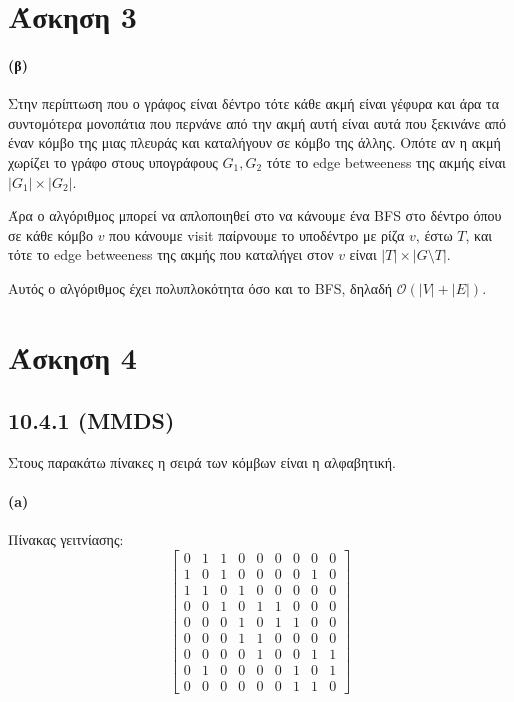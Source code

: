 \documentclass[a4paper,11pt]{article}
\begin{document}
\section*{Άσκηση 3}

\paragraph{(β)} Στην περίπτωση που ο γράφος είναι δέντρο τότε κάθε ακμή είναι γέφυρα και άρα τα συντομότερα μονοπάτια που περνάνε από την ακμή αυτή είναι αυτά που ξεκινάνε από έναν κόμβο της μιας πλευράς και καταλήγουν σε κόμβο της άλλης.
Οπότε αν η ακμή χωρίζει το γράφο στους υπογράφους $G_1,G_2$ τότε το edge betweeness της ακμής είναι $|G_1| \times |G_2|$.

Άρα ο αλγόριθμος μπορεί να απλοποιηθεί στο να κάνουμε ένα BFS στο δέντρο όπου σε κάθε κόμβο $v$ που κάνουμε visit παίρνουμε το υποδέντρο με ρίζα $v$, έστω $T$, και τότε το edge betweeness της ακμής που καταλήγει στον $v$ είναι $|T| \times |G \setminus T|$.

Αυτός ο αλγόριθμος έχει πολυπλοκότητα όσο και το BFS, δηλαδή $\mathcal{O}(|V|+|E|)$.


\section*{Άσκηση 4}

\subsection*{10.4.1 (MMDS)}

Στους παρακάτω πίνακες η σειρά των κόμβων είναι η αλφαβητική.

\paragraph{(a)} Πίνακας γειτνίασης:
\[
	\begin{bmatrix}
		0 & 1 & 1 & 0 & 0 & 0 & 0 & 0 & 0 \\
		1 & 0 & 1 & 0 & 0 & 0 & 0 & 1 & 0 \\
		1 & 1 & 0 & 1 & 0 & 0 & 0 & 0 & 0 \\
		0 & 0 & 1 & 0 & 1 & 1 & 0 & 0 & 0 \\
		0 & 0 & 0 & 1 & 0 & 1 & 1 & 0 & 0 \\
		0 & 0 & 0 & 1 & 1 & 0 & 0 & 0 & 0 \\
		0 & 0 & 0 & 0 & 1 & 0 & 0 & 1 & 1 \\
		0 & 1 & 0 & 0 & 0 & 0 & 1 & 0 & 1 \\
		0 & 0 & 0 & 0 & 0 & 0 & 1 & 1 & 0
	\end{bmatrix}
\]
\end{document}
